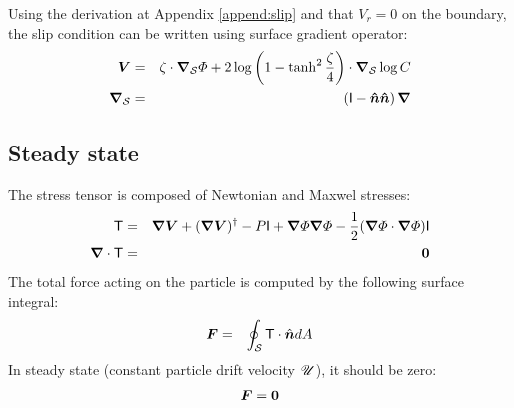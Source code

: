 Using the derivation at Appendix \ref{append:slip} and that $V_r = 0$ 
on the boundary, the slip condition can be written using surface
gradient operator:
\begin{eqnarray}
\boldsymbol{V} &=& 
\zeta \cdot \boldsymbol{\nabla}_\mathcal{S} \varPhi 
+ 2\log\left(1-\tanh^2\frac{\zeta}{4}\right) \cdot \boldsymbol{\nabla}_\mathcal{S} \log C \\
\boldsymbol{\nabla}_\mathcal{S} &=& \left(\mathsf{I} - \boldsymbol{\hat{n}}\boldsymbol{\hat{n}}\right) \boldsymbol{\nabla}
\end{eqnarray}

\subsection{Steady state}
The stress tensor is composed of Newtonian and Maxwel stresses:
\begin{eqnarray}
\mathsf{T} &=& \boldsymbol{\nabla} \boldsymbol{V} + (\boldsymbol{\nabla} \boldsymbol{V})^\dagger - P \mathsf{I}
+ \boldsymbol{\nabla} \varPhi \boldsymbol{\nabla} \varPhi - \frac{1}{2} (\boldsymbol{\nabla} \varPhi \cdot \boldsymbol{\nabla} \varPhi) \mathsf{I} \\
\boldsymbol{\nabla} \cdot \mathsf{T} &=& \boldsymbol{0}
\end{eqnarray}
The total force acting on the particle is computed by the following surface integral:
\begin{eqnarray}
\boldsymbol{F} &=& \oint_\mathcal{S} \mathsf{T} \cdot \hat{\boldsymbol{n}}  dA 
\end{eqnarray}
In steady state (constant particle drift velocity $\mathscr{U}$), it should be zero: 
\begin{eqnarray}
\boldsymbol{F} = \boldsymbol{0}
\end{eqnarray}
